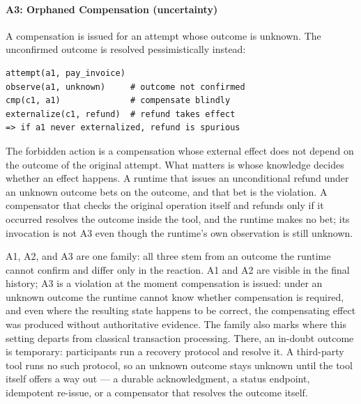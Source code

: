 \documentclass{article}
\begin{document}
\paragraph{A3: Orphaned Compensation (uncertainty)}
A compensation is issued for an attempt whose outcome is unknown.
The unconfirmed outcome is resolved pessimistically instead:
\par\vspace{2pt}\noindent\begin{minipage}{\linewidth}
\begingroup\footnotesize\begin{verbatim}
attempt(a1, pay_invoice)
observe(a1, unknown)     # outcome not confirmed
cmp(c1, a1)              # compensate blindly
externalize(c1, refund)  # refund takes effect
=> if a1 never externalized, refund is spurious
\end{verbatim}\endgroup
\end{minipage}\par\noindent
The forbidden action is a compensation whose external effect does not
depend on the outcome of the original attempt. What matters is whose
knowledge decides whether an effect happens. A runtime that issues an
unconditional refund under an unknown outcome bets on the outcome, and that
bet is the violation. A compensator that checks the original operation
itself and refunds only if it occurred resolves the outcome inside the
tool, and the runtime makes no bet; its invocation is not A3 even though
the runtime's own observation is still unknown.

A1, A2, and A3 are one family: all three stem from an outcome the runtime
cannot confirm and differ only in the reaction. A1 and A2 are visible in
the final history; A3 is a violation at the moment compensation is issued:
under an unknown outcome the runtime cannot know whether compensation is
required, and even where the resulting state happens to be correct, the compensating
effect was produced without authoritative evidence. The family also marks
where this setting departs from classical transaction processing. There, an
in-doubt outcome is temporary: participants run a recovery protocol and
resolve it. A third-party tool runs no such protocol, so an unknown outcome
stays unknown until the tool itself offers a way out --- a durable
acknowledgment, a status endpoint, idempotent re-issue, or a compensator
that resolves the outcome itself.
\end{document}
